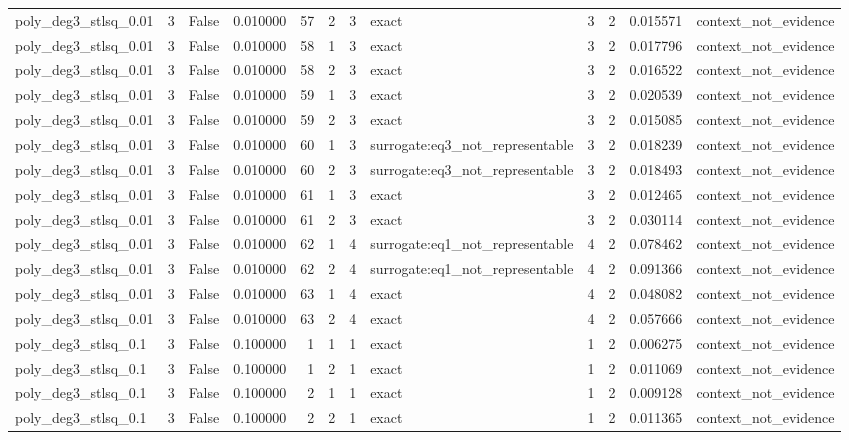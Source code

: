 \begin{tabular}{lrrrrrrlrrrl}
poly\_deg3\_stlsq\_0.01 & 3 & False & 0.010000 & 57 & 2 & 3 & exact & 3 & 2 & 0.015571 & context\_not\_evidence \\
poly\_deg3\_stlsq\_0.01 & 3 & False & 0.010000 & 58 & 1 & 3 & exact & 3 & 2 & 0.017796 & context\_not\_evidence \\
poly\_deg3\_stlsq\_0.01 & 3 & False & 0.010000 & 58 & 2 & 3 & exact & 3 & 2 & 0.016522 & context\_not\_evidence \\
poly\_deg3\_stlsq\_0.01 & 3 & False & 0.010000 & 59 & 1 & 3 & exact & 3 & 2 & 0.020539 & context\_not\_evidence \\
poly\_deg3\_stlsq\_0.01 & 3 & False & 0.010000 & 59 & 2 & 3 & exact & 3 & 2 & 0.015085 & context\_not\_evidence \\
poly\_deg3\_stlsq\_0.01 & 3 & False & 0.010000 & 60 & 1 & 3 & surrogate:eq3\_not\_representable & 3 & 2 & 0.018239 & context\_not\_evidence \\
poly\_deg3\_stlsq\_0.01 & 3 & False & 0.010000 & 60 & 2 & 3 & surrogate:eq3\_not\_representable & 3 & 2 & 0.018493 & context\_not\_evidence \\
poly\_deg3\_stlsq\_0.01 & 3 & False & 0.010000 & 61 & 1 & 3 & exact & 3 & 2 & 0.012465 & context\_not\_evidence \\
poly\_deg3\_stlsq\_0.01 & 3 & False & 0.010000 & 61 & 2 & 3 & exact & 3 & 2 & 0.030114 & context\_not\_evidence \\
poly\_deg3\_stlsq\_0.01 & 3 & False & 0.010000 & 62 & 1 & 4 & surrogate:eq1\_not\_representable & 4 & 2 & 0.078462 & context\_not\_evidence \\
poly\_deg3\_stlsq\_0.01 & 3 & False & 0.010000 & 62 & 2 & 4 & surrogate:eq1\_not\_representable & 4 & 2 & 0.091366 & context\_not\_evidence \\
poly\_deg3\_stlsq\_0.01 & 3 & False & 0.010000 & 63 & 1 & 4 & exact & 4 & 2 & 0.048082 & context\_not\_evidence \\
poly\_deg3\_stlsq\_0.01 & 3 & False & 0.010000 & 63 & 2 & 4 & exact & 4 & 2 & 0.057666 & context\_not\_evidence \\
poly\_deg3\_stlsq\_0.1 & 3 & False & 0.100000 & 1 & 1 & 1 & exact & 1 & 2 & 0.006275 & context\_not\_evidence \\
poly\_deg3\_stlsq\_0.1 & 3 & False & 0.100000 & 1 & 2 & 1 & exact & 1 & 2 & 0.011069 & context\_not\_evidence \\
poly\_deg3\_stlsq\_0.1 & 3 & False & 0.100000 & 2 & 1 & 1 & exact & 1 & 2 & 0.009128 & context\_not\_evidence \\
poly\_deg3\_stlsq\_0.1 & 3 & False & 0.100000 & 2 & 2 & 1 & exact & 1 & 2 & 0.011365 & context\_not\_evidence \\

\end{tabular}
